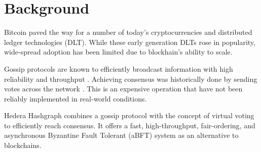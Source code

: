 \section{Background}

Bitcoin \cite{nakamoto2008peer} paved the way for a number of today's cryptocurrencies and distributed ledger technologies (DLT). While these early generation DLTs rose in popularity, wide-spread adoption has been limited due to blockhain's ability to scale. 


Gossip protocols are known to efficiently broadcast information with high reliability and throughput \cite{birman}. Achieving consensus was historically done by sending votes across the network \cite{berman1989towards}. This is an expensive operation that have not been reliably implemented in real-world conditions.

Hedera Hashgraph\cite{baird2016} combines a gossip protocol with the concept of virtual voting to efficiently reach consensus. It offers a fast, high-throughput, fair-ordering, and asynchronous Byzantine Fault Tolerant (aBFT) system as an alternative to blockchains.
